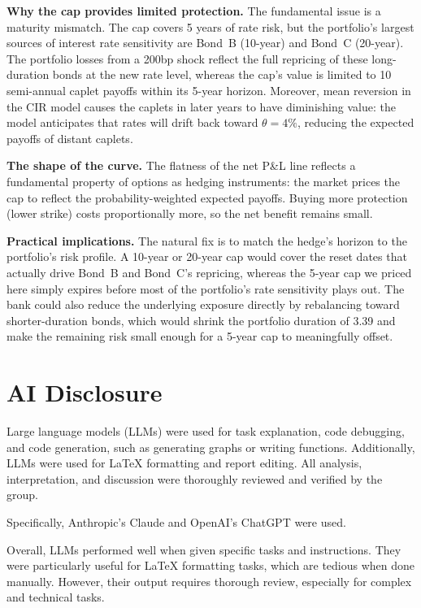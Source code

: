 \documentclass[12pt, a4paper]{article}
\begin{document}
\textbf{Why the cap provides limited protection.} The fundamental issue is a maturity mismatch. The cap covers 5 years of rate risk, but the portfolio's largest sources of interest rate sensitivity are Bond~B (10-year) and Bond~C (20-year). The portfolio losses from a 200bp shock reflect the full repricing of these long-duration bonds at the new rate level, whereas the cap's value is limited to 10 semi-annual caplet payoffs within its 5-year horizon. Moreover, mean reversion in the CIR model causes the caplets in later years to have diminishing value: the model anticipates that rates will drift back toward $\theta = 4\%$, reducing the expected payoffs of distant caplets.

\textbf{The shape of the curve.} The flatness of the net P\&L line reflects a fundamental property of options as hedging instruments: the market prices the cap to reflect the probability-weighted expected payoffs. Buying more protection (lower strike) costs proportionally more, so the net benefit remains small.

\textbf{Practical implications.} The natural fix is to match the hedge's horizon to the portfolio's risk profile. A 10-year or 20-year cap would cover the reset dates that actually drive Bond~B and Bond~C's repricing, whereas the 5-year cap we priced here simply expires before most of the portfolio's rate sensitivity plays out. The bank could also reduce the underlying exposure directly by rebalancing toward shorter-duration bonds, which would shrink the portfolio duration of 3.39 and make the remaining risk small enough for a 5-year cap to meaningfully offset.

\section{AI Disclosure}

Large language models (LLMs) were used for task explanation, code debugging, and code generation, such as generating graphs or writing functions. 
Additionally, LLMs were used for \LaTeX{} formatting and report editing.
All analysis, interpretation, and discussion were thoroughly reviewed and verified by the group.

Specifically, Anthropic's Claude and OpenAI's ChatGPT were used.

Overall, LLMs performed well when given specific tasks and instructions. They were particularly 
useful for \LaTeX{} formatting tasks, which are tedious when done manually. However, their output requires 
thorough review, especially for complex and technical tasks.
\end{document}
